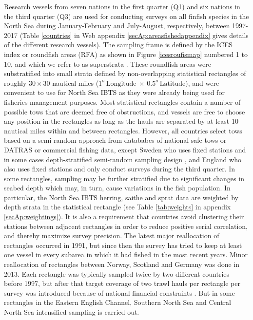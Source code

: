 \documentclass[a4paper 12pt]{article}
\numberwithin{equation}{section}
\begin{document}
Research vessels from seven nations in the first quarter (Q1) and six nations in the third quarter (Q3) are used for conducting surveys on all finfish species in the North Sea during January-February and July-August, respectively, between 1997-2017 (Table \ref{countries} in Web appendix \ref{secAp:areasfishedappendix} gives details of the different research vessels). The sampling frame is defined by the ICES index or roundfish areas (RFA) as shown in Figure \ref{icesroufismap} numbered 1 to 10, and which we refer to as superstrata \citep{nottestad2015quantifying, fuller2011sampling}. These  roundfish areas were substratified into small strata defined by non-overlapping statistical rectangles of roughly $30 \times 30$ nautical miles ($1^{o} \  \mathrm{Longitude} \ \times  \  0.5^{o} \ \mathrm{Latitude}$), and were convenient to use for North Sea IBTS as they were already being used for fisheries management purposes. Most statistical rectangles contain a number of possible tows that are deemed free of obstructions, and vessels are free to choose any position in the rectangles as long as the hauls are separated by at least 10 nautical miles within and between rectangles. However, all countries select tows based on a semi-random approach from datababes of national safe tows or DATRAS or commercial fishing data, except Sweden who uses fixed stations and in some cases depth-stratified semi-random sampling design \citep{ICES2018}, and England who also uses fixed stations and only conduct surveys during the third quarter. In some rectangles, sampling may be further stratified due to significant changes in seabed depth which may, in turn, cause variations in the fish population. In particular, the North Sea IBTS herring, saithe and sprat data are weighted by depth strata in the statistical rectangle (see Table \ref{tab:weights} in appendix \ref{secAp:weightings}). It is also a requirement that countries avoid clustering their stations between adjacent rectangles in order to reduce positive serial correlation, and thereby maximize survey precision.  The latest major reallocation of rectangles occurred in 1991, but since then the survey has tried to keep at least one vessel in every subarea in which it had fished in the most recent years. Minor reallocation of rectangles between Norway, Scotland and Germany was done in 2013. Each rectangle was  typically sampled twice by two different countries before 1997, but after that target coverage of two trawl hauls per rectangle per survey  was introduced because of national financial constraints \citep{ICES2015}. But in some rectangles in the Eastern English Channel, Southern North Sea and Central North Sea intensified sampling is carried out.\\
\end{document}
